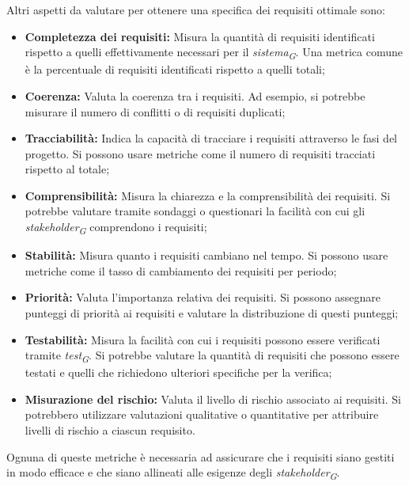 Altri aspetti da valutare per ottenere una specifica dei requisiti ottimale sono:
\begin{itemize}
    \item \textbf{Completezza dei requisiti:} Misura la quantità di requisiti identificati rispetto a quelli effettivamente necessari per il \textit{sistema}\textsubscript{\textit{G}}. Una metrica comune è la percentuale di requisiti identificati rispetto a quelli totali;
    \item \textbf{Coerenza:} Valuta la coerenza tra i requisiti. Ad esempio, si potrebbe misurare il numero di conflitti o di requisiti duplicati;
    \item \textbf{Tracciabilità:} Indica la capacità di tracciare i requisiti attraverso le fasi del progetto. Si possono usare metriche come il numero di requisiti tracciati rispetto al totale;
    \item \textbf{Comprensibilità:} Misura la chiarezza e la comprensibilità dei requisiti. Si potrebbe valutare tramite sondaggi o questionari la facilità con cui gli \textit{stakeholder}\textsubscript{\textit{G}} comprendono i requisiti;
    \item \textbf{Stabilità:} Misura quanto i requisiti cambiano nel tempo. Si possono usare metriche come il tasso di cambiamento dei requisiti per periodo;
    \item \textbf{Priorità:} Valuta l'importanza relativa dei requisiti. Si possono assegnare punteggi di priorità ai requisiti e valutare la distribuzione di questi punteggi;
    \item \textbf{Testabilità:} Misura la facilità con cui i requisiti possono essere verificati tramite \textit{test}\textsubscript{\textit{G}}. Si potrebbe valutare la quantità di requisiti che possono essere testati e quelli che richiedono ulteriori specifiche per la verifica;
    \item \textbf{Misurazione del rischio:} Valuta il livello di rischio associato ai requisiti. Si potrebbero utilizzare valutazioni qualitative o quantitative per attribuire livelli di rischio a ciascun requisito.
\end{itemize}
Ognuna di queste metriche è necessaria ad assicurare che i requisiti siano gestiti in modo efficace e che siano allineati alle esigenze degli \textit{stakeholder}\textsubscript{\textit{G}}.

